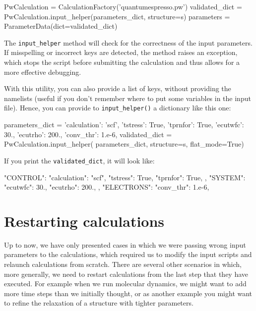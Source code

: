 \begin{pythoncommand}
PwCalculation = CalculationFactory('quantumespresso.pw')
validated_dict = PwCalculation.input_helper(parameters_dict, structure=s)
parameters = ParameterData(dict=validated_dict)
\end{pythoncommand}

The \texttt{input\_helper} method will check for the correctness of the input parameters.
If misspelling or incorrect keys are detected, the method raises an exception, which stops the script before submitting the calculation and thus allows for a more effective debugging.

With this utility, you can also provide a list of keys, without providing the namelists (useful if you don't remember where to put some variables in the input file).
Hence, you can provide to \texttt{input\_helper()} a dictionary like this one:
\begin{pythoncommand}
parameters_dict = {
    'calculation': 'scf',
    'tstress': True,
    'tprnfor': True,
    'ecutwfc': 30.,
    'ecutrho': 200.,
    'conv_thr': 1.e-6,
}
validated_dict = PwCalculation.input_helper(
    parameters_dict, structure=s, flat_mode=True)
\end{pythoncommand}
If you print the \texttt{validated\_dict}, it will look like:
\begin{pythoncommand}
{
    "CONTROL": {
        "calculation": "scf",
        "tstress": True,
        "tprnfor": True,
    },
    "SYSTEM": {
        "ecutwfc": 30.,
        "ecutrho": 200.,
    },
    "ELECTRONS": {
        "conv_thr": 1.e-6,
    }
 }
\end{pythoncommand}



\section{Restarting calculations}
Up to now, we have only presented cases in which we were passing wrong input parameters to the calculations, which required us to modify the input scripts and relaunch calculations from scratch.
There are several other scenarios in which, more generally, we need to restart calculations from the last step that they have executed.
For example when we run molecular dynamics, we might want to add more time steps than we initially thought, or as another example you might want to refine the relaxation of a structure with tighter parameters.

